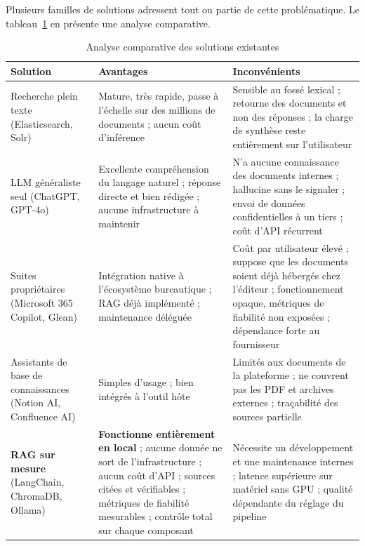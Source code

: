 Plusieurs familles de solutions adressent tout ou partie de cette
problématique. Le tableau~\ref{tab:existant} en présente une analyse comparative.

\begin{table}[htbp]
\centering
\caption{Analyse comparative des solutions existantes}
\label{tab:existant}
\small
\begin{tabularx}{\textwidth}{@{}p{3.1cm}XX@{}}
\toprule
\textbf{Solution} & \textbf{Avantages} & \textbf{Inconvénients} \\
\midrule

Recherche plein texte (Elasticsearch, Solr) &
Mature, très rapide, passe à l'échelle sur des millions de documents ; aucun
coût d'inférence &
Sensible au fossé lexical ; retourne des documents et non des réponses ;
la charge de synthèse reste entièrement sur l'utilisateur \\

\addlinespace
LLM généraliste seul (ChatGPT, GPT-4o) &
Excellente compréhension du langage naturel ; réponse directe et bien rédigée ;
aucune infrastructure à maintenir &
N'a aucune connaissance des documents internes ; hallucine sans le signaler ;
envoi de données confidentielles à un tiers ; coût d'API récurrent \\

\addlinespace
Suites propriétaires (Microsoft 365 Copilot, Glean) &
Intégration native à l'écosystème bureautique ; RAG déjà implémenté ;
maintenance déléguée &
Coût par utilisateur élevé ; suppose que les documents soient déjà hébergés chez
l'éditeur ; fonctionnement opaque, métriques de fiabilité non exposées ;
dépendance forte au fournisseur \\

\addlinespace
Assistants de base de connaissances (Notion AI, Confluence AI) &
Simples d'usage ; bien intégrés à l'outil hôte &
Limités aux documents de la plateforme ; ne couvrent pas les PDF et archives
externes ; traçabilité des sources partielle \\

\addlinespace
\textbf{RAG sur mesure} (LangChain, ChromaDB, Ollama) &
\textbf{Fonctionne entièrement en local} ; aucune donnée ne sort de
l'infrastructure ; aucun coût d'API ; sources citées et vérifiables ; métriques
de fiabilité mesurables ; contrôle total sur chaque composant &
Nécessite un développement et une maintenance internes ; latence supérieure sur
matériel sans GPU ; qualité dépendante du réglage du pipeline \\

\bottomrule
\end{tabularx}
\end{table}


